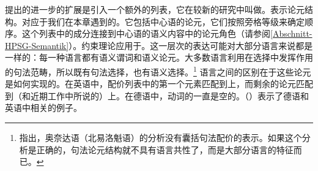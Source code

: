  提出的进一步的扩展是引入一个额外的列表，它在较新的研究中叫做\argst{}。\argstc 表示论元结构。\argstlc 对应于我们在本章遇到的\subcatlc。它包括中心语的论元，它们按照旁格等级来确定顺序。这个列表中的成分连接到中心语的语义内容中的论元角色（请参阅\ref{Abschnitt-HPSG-Semantik}）。约束理论应用于\argstlc。这一层次的表达可能对大部分语言来说都是一样的：每一种语言都有语义谓词和语义论元。大多数语言利用在选择中发挥作用的句法范畴，所以既有句法选择，也有语义选择。\footnote{%
 \citet{KM2012a}指出，奥奈达语（北易洛魁语）的分析没有囊括句法配价的表示。如果这个分析是正确的，句法论元结构就不具有语言共性了，而是大部分语言的特征而已。
}
语言之间的区别在于这些论元是如何实现的。在英语中，配价列表中的第一个元素匹配到\sprlc 上，而剩余的论元匹配到\subcatc （和近期工作中所说的\compslc）上。在德语中，动词的\sprlc 一直是空的。（）表示了德语和英语中相关的例子。

